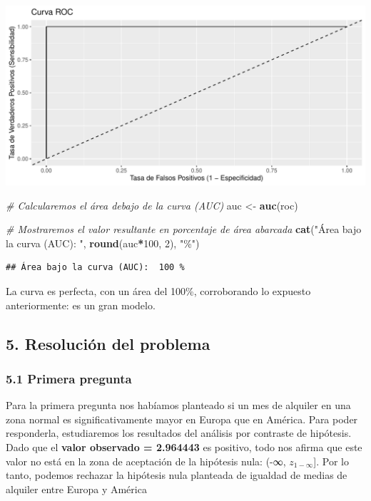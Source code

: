 \documentclass[
]{article}
\newenvironment{Shaded}{\begin{snugshade}}{\end{snugshade}}
\newcommand{\CommentTok}[1]{\textcolor[rgb]{0.56,0.35,0.01}{\textit{#1}}}
\newcommand{\DecValTok}[1]{\textcolor[rgb]{0.00,0.00,0.81}{#1}}
\newcommand{\FunctionTok}[1]{\textcolor[rgb]{0.13,0.29,0.53}{\textbf{#1}}}
\newcommand{\NormalTok}[1]{#1}
\newcommand{\OtherTok}[1]{\textcolor[rgb]{0.56,0.35,0.01}{#1}}
\newcommand{\SpecialCharTok}[1]{\textcolor[rgb]{0.81,0.36,0.00}{\textbf{#1}}}
\newcommand{\StringTok}[1]{\textcolor[rgb]{0.31,0.60,0.02}{#1}}
\begin{document}
\includegraphics{PRA2_Data_cleaning_and_analysis_files/figure-latex/unnamed-chunk-24-1.pdf}

\begin{Shaded}
\begin{Highlighting}[]
\CommentTok{\# Calcularemos el área debajo de la curva (AUC)}
\NormalTok{auc }\OtherTok{\textless{}{-}} \FunctionTok{auc}\NormalTok{(roc)}

\CommentTok{\# Mostraremos el valor resultante en porcentaje de área abarcada}
\FunctionTok{cat}\NormalTok{(}\StringTok{"Área bajo la curva (AUC): "}\NormalTok{, }\FunctionTok{round}\NormalTok{(auc}\SpecialCharTok{*}\DecValTok{100}\NormalTok{, }\DecValTok{2}\NormalTok{), }\StringTok{"\%"}\NormalTok{)}
\end{Highlighting}
\end{Shaded}

\begin{verbatim}
## Área bajo la curva (AUC):  100 %
\end{verbatim}

La curva es perfecta, con un área del 100\%, corroborando lo expuesto
anteriormente: es un gran modelo.

\hypertarget{resoluciuxf3n-del-problema}{%
\subsection{5. Resolución del
problema}\label{resoluciuxf3n-del-problema}}

\hypertarget{primera-pregunta}{%
\subsubsection{5.1 Primera pregunta}\label{primera-pregunta}}

Para la primera pregunta nos habíamos planteado si un mes de alquiler en
una zona normal es significativamente mayor en Europa que en América.
Para poder responderla, estudiaremos los resultados del análisis por
contraste de hipótesis. Dado que el \textbf{valor observado = 2.964443}
es positivo, todo nos afirma que este valor no está en la zona de
aceptación de la hipótesis nula: (-∞, \(z_{1-∞}\){]}. Por lo tanto,
podemos rechazar la hipótesis nula planteada de igualdad de medias de
alquiler entre Europa y América
\end{document}
